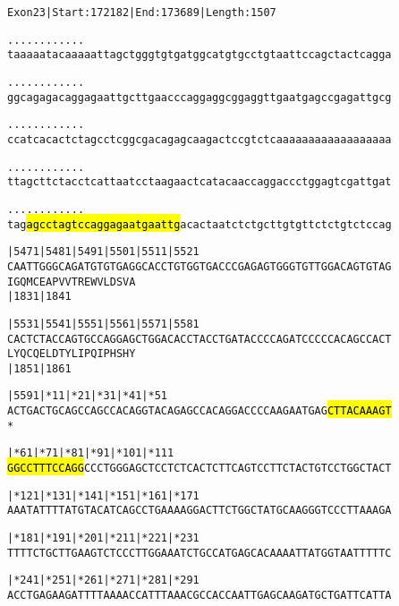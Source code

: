 \documentclass{article}
\begin{document}
\begin{alltt}
Exon 23 | Start: 172182 | End: 173689 | Length: 1507

.    .    .    .    .    .    .    .    .    .    .    .    
taaaaatacaaaaattagctgggtgtgatggcatgtgcctgtaattccagctactcagga

.    .    .    .    .    .    .    .    .    .    .    .    
ggcagagacaggagaattgcttgaacccaggaggcggaggttgaatgagccgagattgcg

.    .    .    .    .    .    .    .    .    .    .    .    
ccatcacactctagcctcggcgacagagcaagactccgtctcaaaaaaaaaaaaaaaaaa

.    .    .    .    .    .    .    .    .    .    .    .    
ttagcttctacctcattaatcctaagaactcatacaaccaggaccctggagtcgattgat

.    .    .    .    .    .    .    .    .    .    .    .    
tag\hl{agcctagtccaggagaatgaattg}acactaatctctgcttgtgttctctgtctccag

   |5471     |5481     |5491     |5501     |5511     |5521  
CAATTGGGCAGATGTGTGAGGCACCTGTGGTGACCCGAGAGTGGGTGTTGGACAGTGTAG
  I  G  Q  M  C  E  A  P  V  V  T  R  E  W  V  L  D  S  V  A
                       |1831                         |1841  

   |5531     |5541     |5551     |5561     |5571     |5581  
CACTCTACCAGTGCCAGGAGCTGGACACCTACCTGATACCCCAGATCCCCCACAGCCACT
  L  Y  Q  C  Q  E  L  D  T  Y  L  I  P  Q  I  P  H  S  H  Y
                       |1851                         |1861  

   |5591       |*11      |*21      |*31      |*41      |*51 
ACTGACTGCAGCCAGCCACAGGTACAGAGCCACAGGACCCCAAGAATGAG\hl{CTTACAAAGT}
  *   

     |*61      |*71      |*81      |*91      |*101     |*111
\hl{GGCCTTTCCAGG}CCCTGGGAGCTCCTCTCACTCTTCAGTCCTTCTACTGTCCTGGCTACT

     |*121     |*131     |*141     |*151     |*161     |*171
AAATATTTTATGTACATCAGCCTGAAAAGGACTTCTGGCTATGCAAGGGTCCCTTAAAGA

     |*181     |*191     |*201     |*211     |*221     |*231
TTTTCTGCTTGAAGTCTCCCTTGGAAATCTGCCATGAGCACAAAATTATGGTAATTTTTC

     |*241     |*251     |*261     |*271     |*281     |*291
ACCTGAGAAGATTTTAAAACCATTTAAACGCCACCAATTGAGCAAGATGCTGATTCATTA

\end{alltt}
\newpage
\end{document}
